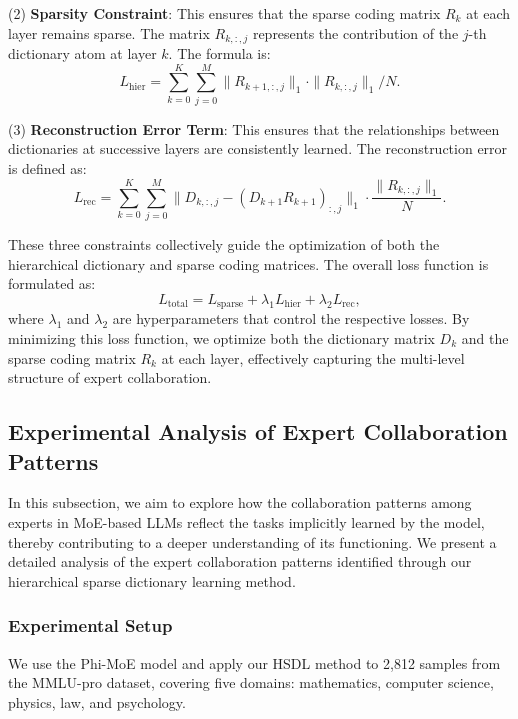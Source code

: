 \documentclass[11pt]{article}
\begin{document}
(2) \textbf{Sparsity Constraint}: This ensures that the sparse coding matrix \( R_k \) at each layer remains sparse.
The matrix \( R_{k,:,j} \) represents the contribution of the \( j \)-th dictionary atom at layer \( k \). The formula is:
\begin{equation}
L_{\text{hier}} = \sum_{k=0}^K\sum_{j=0}^M\| R_{k+1,:,j} \|_1 \cdot \| R_{k,:,j} \|_1 / N.
\end{equation}

(3) \textbf{Reconstruction Error Term}: This ensures that the relationships between dictionaries at successive layers are consistently learned. The reconstruction error is defined as:
\begin{equation}
L_{\text{rec}} = \sum_{k=0}^K\sum_{j=0}^M \| D_{k,:,j} - (D_{k+1} R_{k+1})_{:,j} \|_1 \cdot \frac{\| R_{k,:,j} \|_1} {N}.
\end{equation}



These three constraints collectively guide the optimization of both the hierarchical dictionary and sparse coding matrices. The overall loss function is formulated as:
\begin{equation}
L_{\text{total}} = L_{\text{sparse}} + \lambda_1 L_{\text{hier}} + \lambda_2 L_{\text{rec}},
\end{equation}
where \(\lambda_1\) and \(\lambda_2\) are hyperparameters that control the respective losses. By minimizing this loss function, we optimize both the dictionary matrix \( D_k \) and the sparse coding matrix \( R_k \) at each layer, effectively capturing the multi-level structure of expert collaboration.




\subsection{Experimental Analysis of Expert Collaboration Patterns}

In this subsection, we aim to explore how the collaboration patterns among experts in MoE-based LLMs reflect the tasks implicitly learned by the model, thereby contributing to a deeper understanding of its functioning. We present a detailed analysis of the expert collaboration patterns identified through our hierarchical sparse dictionary learning method.


\subsubsection{Experimental Setup}  
We use the Phi-MoE model and apply our HSDL method to 2,812 samples from the MMLU-pro dataset, covering five domains: mathematics, computer science, physics, law, and psychology. 
\end{document}
